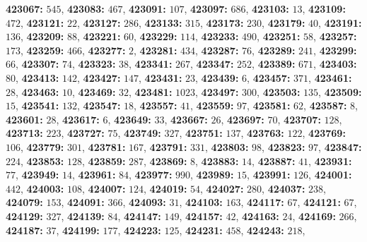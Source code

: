 \textsf{\bfseries 423067:} $545$, \textsf{\bfseries 423083:} $467$, \textsf{\bfseries 423091:} $107$, \textsf{\bfseries 423097:} $686$, \textsf{\bfseries 423103:} $13$, \textsf{\bfseries 423109:} $472$, \textsf{\bfseries 423121:} $22$, \textsf{\bfseries 423127:} $286$, \textsf{\bfseries 423133:} $315$, \textsf{\bfseries 423173:} $230$, \textsf{\bfseries 423179:} $40$, \textsf{\bfseries 423191:} $136$, \textsf{\bfseries 423209:} $88$, \textsf{\bfseries 423221:} $60$, \textsf{\bfseries 423229:} $114$, \textsf{\bfseries 423233:} $490$, \textsf{\bfseries 423251:} $58$, \textsf{\bfseries 423257:} $173$, \textsf{\bfseries 423259:} $466$, \textsf{\bfseries 423277:} $2$, \textsf{\bfseries 423281:} $434$, \textsf{\bfseries 423287:} $76$, \textsf{\bfseries 423289:} $241$, \textsf{\bfseries 423299:} $66$, \textsf{\bfseries 423307:} $74$, \textsf{\bfseries 423323:} $38$, \textsf{\bfseries 423341:} $267$, \textsf{\bfseries 423347:} $252$, \textsf{\bfseries 423389:} $671$, \textsf{\bfseries 423403:} $80$, \textsf{\bfseries 423413:} $142$, \textsf{\bfseries 423427:} $147$, \textsf{\bfseries 423431:} $23$, \textsf{\bfseries 423439:} $6$, \textsf{\bfseries 423457:} $371$, \textsf{\bfseries 423461:} $28$, \textsf{\bfseries 423463:} $10$, \textsf{\bfseries 423469:} $32$, \textsf{\bfseries 423481:} $1023$, \textsf{\bfseries 423497:} $300$, \textsf{\bfseries 423503:} $135$, \textsf{\bfseries 423509:} $15$, \textsf{\bfseries 423541:} $132$, \textsf{\bfseries 423547:} $18$, \textsf{\bfseries 423557:} $41$, \textsf{\bfseries 423559:} $97$, \textsf{\bfseries 423581:} $62$, \textsf{\bfseries 423587:} $8$, \textsf{\bfseries 423601:} $28$, \textsf{\bfseries 423617:} $6$, \textsf{\bfseries 423649:} $33$, \textsf{\bfseries 423667:} $26$, \textsf{\bfseries 423697:} $70$, \textsf{\bfseries 423707:} $128$, \textsf{\bfseries 423713:} $223$, \textsf{\bfseries 423727:} $75$, \textsf{\bfseries 423749:} $327$, \textsf{\bfseries 423751:} $137$, \textsf{\bfseries 423763:} $122$, \textsf{\bfseries 423769:} $106$, \textsf{\bfseries 423779:} $301$, \textsf{\bfseries 423781:} $167$, \textsf{\bfseries 423791:} $331$, \textsf{\bfseries 423803:} $98$, \textsf{\bfseries 423823:} $97$, \textsf{\bfseries 423847:} $224$, \textsf{\bfseries 423853:} $128$, \textsf{\bfseries 423859:} $287$, \textsf{\bfseries 423869:} $8$, \textsf{\bfseries 423883:} $14$, \textsf{\bfseries 423887:} $41$, \textsf{\bfseries 423931:} $77$, \textsf{\bfseries 423949:} $14$, \textsf{\bfseries 423961:} $84$, \textsf{\bfseries 423977:} $990$, \textsf{\bfseries 423989:} $15$, \textsf{\bfseries 423991:} $126$, \textsf{\bfseries 424001:} $442$, \textsf{\bfseries 424003:} $108$, \textsf{\bfseries 424007:} $124$, \textsf{\bfseries 424019:} $54$, \textsf{\bfseries 424027:} $280$, \textsf{\bfseries 424037:} $238$, \textsf{\bfseries 424079:} $153$, \textsf{\bfseries 424091:} $366$, \textsf{\bfseries 424093:} $31$, \textsf{\bfseries 424103:} $163$, \textsf{\bfseries 424117:} $67$, \textsf{\bfseries 424121:} $67$, \textsf{\bfseries 424129:} $327$, \textsf{\bfseries 424139:} $84$, \textsf{\bfseries 424147:} $149$, \textsf{\bfseries 424157:} $42$, \textsf{\bfseries 424163:} $24$, \textsf{\bfseries 424169:} $266$, \textsf{\bfseries 424187:} $37$, \textsf{\bfseries 424199:} $177$, \textsf{\bfseries 424223:} $125$, \textsf{\bfseries 424231:} $458$, \textsf{\bfseries 424243:} $218$, 
